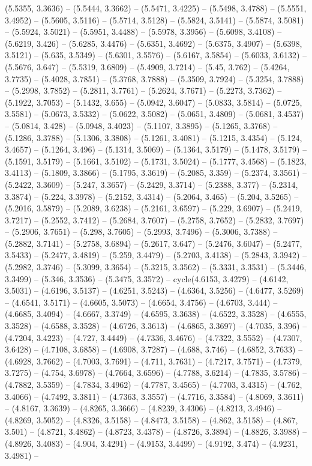 (5.5355, 3.3636) -- (5.5444, 3.3662) -- (5.5471, 3.4225) -- (5.5498, 3.4788) -- (5.5551, 3.4952) -- (5.5605, 3.5116) -- (5.5714, 3.5128) -- (5.5824, 3.5141) -- (5.5874, 3.5081) -- (5.5924, 3.5021) -- (5.5951, 3.4488) -- (5.5978, 3.3956) -- (5.6098, 3.4108) -- (5.6219, 3.426) -- (5.6285, 3.4476) -- (5.6351, 3.4692) -- (5.6375, 3.4907) -- (5.6398, 3.5121) -- (5.635, 3.5349) -- (5.6301, 3.5576) -- (5.6167, 3.5854) -- (5.6033, 3.6132) -- (5.5676, 3.647) -- (5.5319, 3.6809) -- (5.4909, 3.7214) -- (5.45, 3.762) -- (5.4264, 3.7735) -- (5.4028, 3.7851) -- (5.3768, 3.7888) -- (5.3509, 3.7924) -- (5.3254, 3.7888) -- (5.2998, 3.7852) -- (5.2811, 3.7761) -- (5.2624, 3.7671) -- (5.2273, 3.7362) -- (5.1922, 3.7053) -- (5.1432, 3.655) -- (5.0942, 3.6047) -- (5.0833, 3.5814) -- (5.0725, 3.5581) -- (5.0673, 3.5332) -- (5.0622, 3.5082) -- (5.0651, 3.4809) -- (5.0681, 3.4537) -- (5.0814, 3.428) -- (5.0948, 3.4023) -- (5.1107, 3.3895) -- (5.1265, 3.3768) -- (5.1286, 3.3788) -- (5.1306, 3.3808) -- (5.1261, 3.4081) -- (5.1215, 3.4354) -- (5.124, 3.4657) -- (5.1264, 3.496) -- (5.1314, 3.5069) -- (5.1364, 3.5179) -- (5.1478, 3.5179) -- (5.1591, 3.5179) -- (5.1661, 3.5102) -- (5.1731, 3.5024) -- (5.1777, 3.4568) -- (5.1823, 3.4113) -- (5.1809, 3.3866) -- (5.1795, 3.3619) -- (5.2085, 3.359) -- (5.2374, 3.3561) -- (5.2422, 3.3609) -- (5.247, 3.3657) -- (5.2429, 3.3714) -- (5.2388, 3.377) -- (5.2314, 3.3874) -- (5.224, 3.3978) -- (5.2152, 3.4314) -- (5.2064, 3.465) -- (5.204, 3.5265) -- (5.2016, 3.5879) -- (5.2089, 3.6238) -- (5.2161, 3.6597) -- (5.229, 3.6907) -- (5.2419, 3.7217) -- (5.2552, 3.7412) -- (5.2684, 3.7607) -- (5.2758, 3.7652) -- (5.2832, 3.7697) -- (5.2906, 3.7651) -- (5.298, 3.7605) -- (5.2993, 3.7496) -- (5.3006, 3.7388) -- (5.2882, 3.7141) -- (5.2758, 3.6894) -- (5.2617, 3.647) -- (5.2476, 3.6047) -- (5.2477, 3.5433) -- (5.2477, 3.4819) -- (5.259, 3.4479) -- (5.2703, 3.4138) -- (5.2843, 3.3942) -- (5.2982, 3.3746) -- (5.3099, 3.3654) -- (5.3215, 3.3562) -- (5.3331, 3.3531) -- (5.3446, 3.3499) -- (5.346, 3.3536) -- (5.3475, 3.3572) -- cycle(4.6153, 3.4279) -- (4.6142, 3.5031) -- (4.6196, 3.5137) -- (4.6251, 3.5243) -- (4.6364, 3.5256) -- (4.6477, 3.5269) -- (4.6541, 3.5171) -- (4.6605, 3.5073) -- (4.6654, 3.4756) -- (4.6703, 3.444) -- (4.6685, 3.4094) -- (4.6667, 3.3749) -- (4.6595, 3.3638) -- (4.6522, 3.3528) -- (4.6555, 3.3528) -- (4.6588, 3.3528) -- (4.6726, 3.3613) -- (4.6865, 3.3697) -- (4.7035, 3.396) -- (4.7204, 3.4223) -- (4.727, 3.4449) -- (4.7336, 3.4676) -- (4.7322, 3.5552) -- (4.7307, 3.6428) -- (4.7108, 3.6858) -- (4.6908, 3.7287) -- (4.688, 3.746) -- (4.6852, 3.7633) -- (4.6928, 3.7662) -- (4.7003, 3.7691) -- (4.711, 3.7631) -- (4.7217, 3.7571) -- (4.7379, 3.7275) -- (4.754, 3.6978) -- (4.7664, 3.6596) -- (4.7788, 3.6214) -- (4.7835, 3.5786) -- (4.7882, 3.5359) -- (4.7834, 3.4962) -- (4.7787, 3.4565) -- (4.7703, 3.4315) -- (4.762, 3.4066) -- (4.7492, 3.3811) -- (4.7363, 3.3557) -- (4.7716, 3.3584) -- (4.8069, 3.3611) -- (4.8167, 3.3639) -- (4.8265, 3.3666) -- (4.8239, 3.4306) -- (4.8213, 3.4946) -- (4.8269, 3.5052) -- (4.8326, 3.5158) -- (4.8473, 3.5158) -- (4.862, 3.5158) -- (4.867, 3.501) -- (4.8721, 3.4862) -- (4.8723, 3.4378) -- (4.8726, 3.3894) -- (4.8826, 3.3988) -- (4.8926, 3.4083) -- (4.904, 3.4291) -- (4.9153, 3.4499) -- (4.9192, 3.474) -- (4.9231, 3.4981) -- 